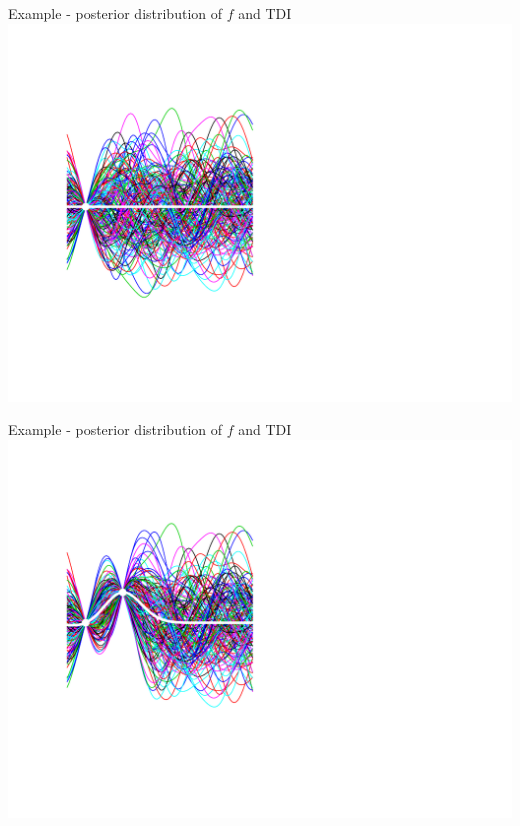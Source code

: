 \documentclass[ignorenonframetext,xcolor=pdflatex,table,dvipsnames,serif]{beamer}
\begin{document}
\begin{frame}{Example - posterior distribution of $f$ and TDI}
  \center\includegraphics[scale=0.5]{probAni01}
\end{frame}

\begin{frame}{Example - posterior distribution of $f$ and TDI}
  \center\includegraphics[scale=0.5]{probAni02}
\end{frame}
\end{document}
